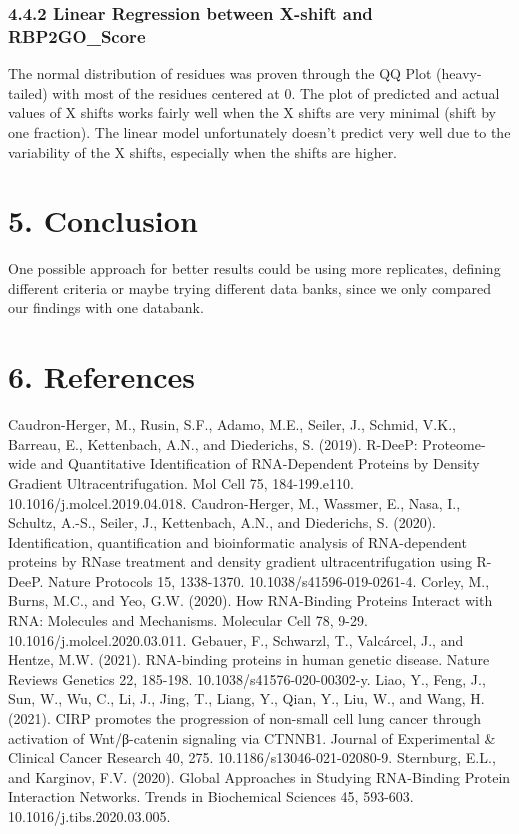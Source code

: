\documentclass[
]{article}
\begin{document}
\hypertarget{linear-regression-between-x-shift-and-rbp2go_score}{%
\subsubsection{4.4.2 Linear Regression between X-shift and
RBP2GO\_Score}\label{linear-regression-between-x-shift-and-rbp2go_score}}

The normal distribution of residues was proven through the QQ Plot
(heavy-tailed) with most of the residues centered at 0. The plot of
predicted and actual values of X shifts works fairly well when the X
shifts are very minimal (shift by one fraction). The linear model
unfortunately doesn't predict very well due to the variability of the X
shifts, especially when the shifts are higher.

\hypertarget{conclusion}{%
\section{5. Conclusion}\label{conclusion}}

One possible approach for better results could be using more replicates,
defining different criteria or maybe trying different data banks, since
we only compared our findings with one databank.

\hypertarget{references}{%
\section{6. References}\label{references}}

Caudron-Herger, M., Rusin, S.F., Adamo, M.E., Seiler, J., Schmid, V.K.,
Barreau, E., Kettenbach, A.N., and Diederichs, S. (2019). R-DeeP:
Proteome-wide and Quantitative Identification of RNA-Dependent Proteins
by Density Gradient Ultracentrifugation. Mol Cell 75, 184-199.e110.
10.1016/j.molcel.2019.04.018. Caudron-Herger, M., Wassmer, E., Nasa, I.,
Schultz, A.-S., Seiler, J., Kettenbach, A.N., and Diederichs, S. (2020).
Identification, quantification and bioinformatic analysis of
RNA-dependent proteins by RNase treatment and density gradient
ultracentrifugation using R-DeeP. Nature Protocols 15, 1338-1370.
10.1038/s41596-019-0261-4. Corley, M., Burns, M.C., and Yeo, G.W.
(2020). How RNA-Binding Proteins Interact with RNA: Molecules and
Mechanisms. Molecular Cell 78, 9-29. 10.1016/j.molcel.2020.03.011.
Gebauer, F., Schwarzl, T., Valcárcel, J., and Hentze, M.W. (2021).
RNA-binding proteins in human genetic disease. Nature Reviews Genetics
22, 185-198. 10.1038/s41576-020-00302-y. Liao, Y., Feng, J., Sun, W.,
Wu, C., Li, J., Jing, T., Liang, Y., Qian, Y., Liu, W., and Wang, H.
(2021). CIRP promotes the progression of non-small cell lung cancer
through activation of Wnt/β-catenin signaling via CTNNB1. Journal of
Experimental \& Clinical Cancer Research 40, 275.
10.1186/s13046-021-02080-9. Sternburg, E.L., and Karginov, F.V. (2020).
Global Approaches in Studying RNA-Binding Protein Interaction Networks.
Trends in Biochemical Sciences 45, 593-603. 10.1016/j.tibs.2020.03.005.
\end{document}
